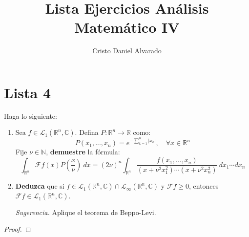 \documentclass[12pt]{report}
\theoremstyle{largebreak}
\renewcommand{\geq}{\ensuremath{\geqslant}}
\newcommand\abs[1]{\ensuremath{\left|#1\right|}}
\newcommand\cf[3]{\ensuremath{#1:#2\rightarrow#3}}
\newcommand{\fou}[1]{\ensuremath{\mathcal{F}#1}}
\begin{document}
    \setlength{\parskip}{5pt} %
    \setlength{\parindent}{12pt} %
    \title{Lista Ejercicios Análisis Matemático IV}
    \author{Cristo Daniel Alvarado}
    \maketitle

    \tableofcontents %

    
    \chapter{Lista 4}
    
    \renewcommand{\theenumi}{\roman{enumi}}

    \begin{excer}
        Haga lo siguiente:
        \begin{enumerate}
            \item Sea $f\in\mathcal{L}_1(\mathbb{R}^n,\mathbb{C})$. Defina $\cf{P}{\mathbb{R}^n}{\mathbb{R}}$ como:
            \begin{equation*}
                P(x_1,...,x_n)=e^{ -\sum_{ k=1}^n \abs{x_k}},\quad\forall x\in\mathbb{R}^n
            \end{equation*}
            Fije $\nu\in\mathbb{N}$, \textbf{demuestre} la fórmula:
            \begin{equation*}
                \int_{\mathbb{R}^n}\fou{f}(x)P\left(\frac{x}{\nu}\right)\:dx=(2\nu)^n\int_{\mathbb{R}^n}\frac{f(x_1,...,x_n)}{(x+\nu^2x_1^2)\cdots(x+\nu^2x_n^2)}\:dx_1\cdots dx_n
            \end{equation*}
            \item \textbf{Deduzca} que si $f\in\mathcal{L}_1(\mathbb{R}^n,\mathbb{C})\cap\mathcal{L}_{\infty}(\mathbb{R}^n,\mathbb{C})$ y $\fou{f}\geq0$, entonces $\fou{f}\in\mathcal{L}_1(\mathbb{R}^n,\mathbb{C})$.
            
            \textit{Sugerencia.} Aplique el teorema de Beppo-Levi.
        \end{enumerate}
    \end{excer}

    \begin{proof}
        
    \end{proof}
\end{document}
